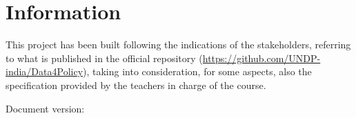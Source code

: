 \section*{Information}
This project has been built following the indications of the stakeholders, referring to what is published in the official repository (\href{https://github.com/UNDP-india/Data4Policy}{https://github.com/UNDP-india/Data4Policy}), taking into consideration, for some aspects, also the specification provided by the teachers in charge of the course.

\vfill
Document version: \documentVersion